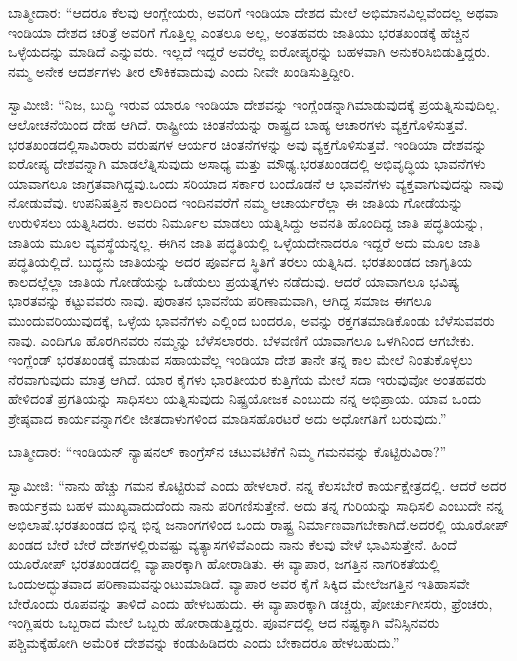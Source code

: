 ಬಾತ್ಮೀದಾರ: “ಆದರೂ ಕೆಲವು ಆಂಗ್ಲೇಯರು, ಅವರಿಗೆ ಇಂಡಿಯಾ ದೇಶದ ಮೇಲೆ ಅಭಿಮಾನವಿಲ್ಲವೆಂದಲ್ಲ ಅಥವಾ ಇಂಡಿಯಾ ದೇಶದ ಚರಿತ್ರೆ ಅವರಿಗೆ ಗೊತ್ತಿಲ್ಲ ಎಂತಲೂ ಅಲ್ಲ, ಅಂತಹವರು ಜಾತಿಯು ಭರತಖಂಡಕ್ಕೆ ಹೆಚ್ಚಿನ ಒಳ್ಳೆಯದನ್ನು ಮಾಡಿದೆ ಎನ್ನುವರು. ಇಲ್ಲದೆ ಇದ್ದರೆ ಅವರೆಲ್ಲ ಐರೋಪ್ಯರನ್ನು ಬಹಳವಾಗಿ ಅನುಕರಿಸಿಬಿಡುತ್ತಿದ್ದರು. ನಮ್ಮ ಅನೇಕ ಆದರ್ಶಗಳು ತೀರ ಲೌಕಿಕವಾದುವು ಎಂದು ನೀವೇ ಖಂಡಿಸುತ್ತಿದ್ದೀರಿ.

ಸ್ವಾಮೀಜಿ: “ನಿಜ, ಬುದ್ಧಿ ಇರುವ ಯಾರೂ ಇಂಡಿಯಾ ದೇಶವನ್ನು ಇಂಗ್ಲೆಂಡನ್ನಾಗಿ\break ಮಾಡುವುದಕ್ಕೆ ಪ್ರಯತ್ನಿಸುವುದಿಲ್ಲ. ಆಲೋಚನೆಯಿಂದ ದೇಹ ಆಗಿದೆ. ರಾಷ್ಟ್ರೀಯ ಚಿಂತನೆಯನ್ನು ರಾಷ್ಟ್ರದ ಬಾಹ್ಯ ಆಚಾರಗಳು ವ್ಯಕ್ತಗೊಳಿಸುತ್ತವೆ. ಭರತಖಂಡದಲ್ಲಿ\break ಸಾವಿರಾರು ವರುಷಗಳ ಆರ್ಯರ ಚಿಂತನೆಗಳನ್ನು ಅವು ವ್ಯಕ್ತಗೊಳಿಸುತ್ತವೆ. ಇಂಡಿಯಾ ದೇಶವನ್ನು ಐರೋಪ್ಯ ದೇಶವನ್ನಾಗಿ ಮಾಡಲೆತ್ನಿಸುವುದು ಅಸಾಧ್ಯ ಮತ್ತು ಮೌಢ್ಯ.\break ಭರತಖಂಡದಲ್ಲಿ ಅಭಿವೃದ್ಧಿಯ ಭಾವನೆಗಳು ಯಾವಾಗಲೂ ಜಾಗ್ರತವಾಗಿದ್ದವು.\break ಒಂದು ಸರಿಯಾದ ಸರ್ಕಾರ ಬಂದೊಡನೆ ಆ ಭಾವನೆಗಳು ವ್ಯಕ್ತವಾಗುವುದನ್ನು ನಾವು ನೋಡುವೆವು. ಉಪನಿಷತ್ತಿನ ಕಾಲದಿಂದ ಇಂದಿನವರೆಗೆ ನಮ್ಮ ಆಚಾರ್ಯರೆಲ್ಲಾ ಈ ಜಾತಿಯ ಗೋಡೆಯನ್ನು ಉರುಳಿಸಲು ಯತ್ನಿಸಿದರು. ಅವರು ನಿರ್ಮೂಲ ಮಾಡಲು ಯತ್ನಿಸಿದ್ದು ಅವನತಿ ಹೊಂದಿದ್ದ ಜಾತಿ ಪದ್ಧತಿಯನ್ನು, ಜಾತಿಯ ಮೂಲ ವ್ಯವಸ್ಥೆಯನ್ನಲ್ಲ. ಈಗಿನ ಜಾತಿ ಪದ್ಧತಿಯಲ್ಲಿ ಒಳ್ಳೆಯದೇನಾದರೂ ಇದ್ದರೆ ಅದು ಮೂಲ ಜಾತಿ ಪದ್ಧತಿಯಲ್ಲಿದೆ. ಬುದ್ಧನು ಜಾತಿಯನ್ನು ಅದರ ಪೂರ್ವದ ಸ್ಥಿತಿಗೆ ತರಲು ಯತ್ನಿಸಿದ. ಭರತಖಂಡದ ಜಾಗೃತಿಯ ಕಾಲದಲ್ಲೆಲ್ಲಾ ಜಾತಿಯ ಗೋಡೆಯನ್ನು ಒಡೆಯಲು ಪ್ರಯತ್ನಗಳು ನಡೆದುವು. ಆದರೆ ಯಾವಾಗಲೂ ಭವಿಷ್ಯ ಭಾರತವನ್ನು ಕಟ್ಟುವವರು ನಾವು. ಪುರಾತನ ಭಾವನೆಯ ಪರಿಣಾಮವಾಗಿ, ಆಗಿದ್ದ ಸಮಾಜ ಈಗಲೂ ಮುಂದುವರಿಯುವುದಕ್ಕೆ, ಒಳ್ಳೆಯ ಭಾವನೆಗಳು ಎಲ್ಲಿಂದ ಬಂದರೂ, ಅವನ್ನು ರಕ್ತಗತಮಾಡಿಕೊಂಡು ಬೆಳೆಸುವವರು ನಾವು. ಎಂದಿಗೂ ಹೊರಗಿನವರು ನಮ್ಮನ್ನು ಬೆಳೆಸಲಾರರು. ಬೆಳವಣಿಗೆ ಯಾವಾಗಲೂ ಒಳಗಿನಿಂದ ಆಗಬೇಕು. ಇಂಗ್ಲೆಂಡ್​ ಭರತಖಂಡಕ್ಕೆ ಮಾಡುವ ಸಹಾಯವೆಲ್ಲ ಇಂಡಿಯಾ ದೇಶ ತಾನೇ ತನ್ನ ಕಾಲ ಮೇಲೆ ನಿಂತುಕೊಳ್ಳಲು ನೆರವಾಗುವುದು ಮಾತ್ರ ಆಗಿದೆ. ಯಾರ ಕೈಗಳು ಭಾರತೀಯರ ಕುತ್ತಿಗೆಯ ಮೇಲೆ ಸದಾ ಇರುವುವೋ ಅಂತಹವರು ಹೇಳಿದಂತೆ ಪ್ರಗತಿಯನ್ನು ಸಾಧಿಸಲು ಯತ್ನಿಸುವುದು ನಿಷ್ಪ್ರಯೋಜಕ ಎಂಬುದು ನನ್ನ ಅಭಿಪ್ರಾಯ. ಯಾವ ಒಂದು ಶ್ರೇಷ್ಠವಾದ ಕಾರ್ಯವನ್ನಾಗಲೀ ಜೀತದಾಳುಗಳಿಂದ ಮಾಡಿಸಹೊರಟರೆ ಅದು ಅಧೋಗತಿಗೆ ಬರುವುದು.”

ಬಾತ್ಮೀದಾರ: “ಇಂಡಿಯನ್​ ನ್ಯಾಷನಲ್​ ಕಾಂಗ್ರೆಸ್​ನ ಚಟುವಟಿಕೆಗೆ ನಿಮ್ಮ ಗಮನವನ್ನು ಕೊಟ್ಟಿರುವಿರಾ?”

ಸ್ವಾಮೀಜಿ: “ನಾನು ಹೆಚ್ಚು ಗಮನ ಕೊಟ್ಟಿರುವೆ ಎಂದು ಹೇಳಲಾರೆ. ನನ್ನ ಕೆಲಸ\break ಬೇರೆ ಕಾರ್ಯಕ್ಷೇತ್ರದಲ್ಲಿ. ಆದರೆ ಅದರ ಕಾರ್ಯಕ್ರಮ ಬಹಳ ಮುಖ್ಯವಾದುದೆಂದು ನಾನು ಪರಿಗಣಿಸುತ್ತೇನೆ. ಅದು ತನ್ನ ಗುರಿಯನ್ನು ಸಾಧಿಸಲಿ ಎಂಬುದೇ ನನ್ನ ಅಭಿಲಾಷೆ.\break ಭರತಖಂಡದ ಭಿನ್ನ ಭಿನ್ನ ಜನಾಂಗಗಳಿಂದ ಒಂದು ರಾಷ್ಟ್ರ ನಿರ್ಮಾಣವಾಗಬೇಕಾಗಿದೆ.\break ಅದರಲ್ಲಿ ಯೂರೋಪ್​ ಖಂಡದ ಬೇರೆ ಬೇರೆ ದೇಶಗಳಲ್ಲಿರುವಷ್ಟು ವ್ಯತ್ಯಾಸಗಳಿವೆ\break ಎಂದು ನಾನು ಕೆಲವು ವೇಳೆ ಭಾವಿಸುತ್ತೇನೆ. ಹಿಂದೆ ಯೂರೋಪ್​ ಭರತಖಂಡದಲ್ಲಿ ವ್ಯಾಪಾರಕ್ಕಾಗಿ ಹೋರಾಡಿತು. ಈ ವ್ಯಾಪಾರ, ಜಗತ್ತಿನ ನಾಗರಿಕತೆಯಲ್ಲಿ ಒಂದು\break ಅದ್ಭುತವಾದ ಪರಿಣಾಮವನ್ನುಂಟುಮಾಡಿದೆ. ವ್ಯಾಪಾರ ಅವರ ಕೈಗೆ ಸಿಕ್ಕಿದ ಮೇಲೆ\break ಜಗತ್ತಿನ ಇತಿಹಾಸವೇ ಬೇರೊಂದು ರೂಪವನ್ನು ತಾಳಿದೆ ಎಂದು ಹೇಳಬಹುದು. ಈ ವ್ಯಾಪಾರಕ್ಕಾಗಿ ಡಚ್ಚರು, ಪೋರ್ಚುಗೀಸರು, ಫ್ರೆಂಚರು, ಇಂಗ್ಲಿಷರು ಒಬ್ಬರಾದ ಮೇಲೆ ಒಬ್ಬರು ಹೋರಾಡುತ್ತಿದ್ದರು. ಪೂರ್ವದಲ್ಲಿ ಆದ ನಷ್ಟಕ್ಕಾಗಿ ವೆನಿಸ್ಸಿನವರು ಪಶ್ಚಿಮಕ್ಕೆ\break ಹೋಗಿ ಅಮೆರಿಕ ದೇಶವನ್ನು ಕಂಡುಹಿಡಿದರು ಎಂದು ಬೇಕಾದರೂ ಹೇಳಬಹುದು.”

